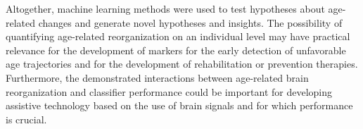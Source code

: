 Altogether, machine learning methods were used to test hypotheses about age-related changes and generate novel hypotheses and insights. The possibility of quantifying age-related reorganization on an individual level may have practical relevance for the development of markers for the early detection of unfavorable age trajectories and for the development of rehabilitation or prevention therapies. Furthermore, the demonstrated interactions between age-related brain reorganization and classifier performance could be important for developing assistive technology based on the use of brain signals and for which performance is crucial.

